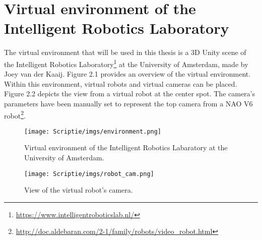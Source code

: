 \documentclass{uva-inf-bachelor-thesis}
\begin{document}

    \section{Virtual environment of the Intelligent Robotics Laboratory}
        The virtual environment that will be used in this thesis is a 3D Unity scene of the Intelligent Robotics Laboratory\footnote{\url{https://www.intelligentroboticslab.nl/}} at the University of Amsterdam, made by Joey van der Kaaij. Figure 2.1 provides an overview of the virtual environment. Within this environment, virtual robots and virtual cameras can be placed. Figure 2.2 depicts the view from a virtual robot at the center spot. The camera's parameters have been manually set to represent the top camera from a NAO V6 robot\footnote{\url{http://doc.aldebaran.com/2-1/family/robots/video\_robot.html}}.
        
        \begin{figure}[!tbp]
          \centering
          \begin{minipage}[b]{0.45\textwidth}
            \texttt{[image: Scriptie/imgs/environment.png]}
            \caption{Virtual environment of the Intelligent Robotics Labaratory at the University of Amsterdam.}
          \end{minipage}
          \hfill
          \begin{minipage}[b]{0.45\textwidth}
            \texttt{[image: Scriptie/imgs/robot\_cam.png]}
            \caption{View of the virtual robot's camera.}
          \end{minipage}
        \end{figure}
\end{document}
